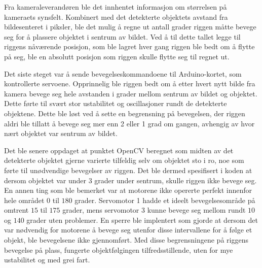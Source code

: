 Fra kameraleverandøren ble det innhentet informasjon om størrelsen på kameraets synsfelt. Kombinert med det detekterte objektets avstand fra bildesenteret i piksler, ble det mulig å regne ut antall grader riggen måtte bevege seg for å plassere objektet i sentrum av bildet. Ved å til dette tallet legge til riggens nåværende posisjon, som ble lagret hver gang riggen ble bedt om å flytte på seg, ble en absolutt posisjon som riggen skulle flytte seg til regnet ut.

Det siste steget var å sende bevegelseskommandoene til Arduino-kortet, som kontrollerte servoene. Opprinnelig ble riggen bedt om å etter hvert nytt bilde fra kamera bevege seg hele avstanden i grader mellom sentrum av bildet og objektet. Dette førte til svært stor ustabilitet og oscillasjoner rundt de detekterte objektene. Dette ble løst ved å sette en begrensning på bevegelsen, der riggen aldri ble tillatt å bevege seg mer enn 2 eller 1 grad om gangen, avhengig av hvor nært objektet var sentrum av bildet.

Det ble senere oppdaget at punktet OpenCV beregnet som midten av det detekterte objektet gjerne varierte tilfeldig selv om objektet sto i ro, noe som førte til unødvendige bevegelser av riggen. Det ble dermed spesifisert i koden at dersom objektet var under 3 grader under sentrum, skulle riggen ikke bevege seg. En annen ting som ble bemerket var at motorene ikke opererte perfekt innenfor hele området $0$ til $180$ grader. Servomotor 1 hadde et ideelt bevegelsesområde på omtrent $15$ til $175$ grader, mens servomotor 3 kunne bevege seg mellom rundt $10$ og $140$ grader uten problemer. En sperre ble implentert som gjorde at dersom det var nødvendig for motorene å bevege seg utenfor disse intervallene for å følge et objekt, ble bevegelsene ikke gjennomført. Med disse begrensningene på riggens bevegelse på plass, fungerte objektfølgingen tilfredsstillende, uten for mye ustabilitet og med grei fart.